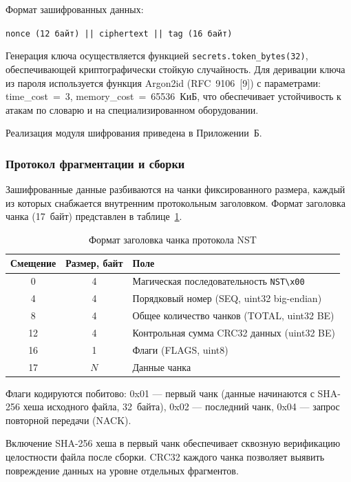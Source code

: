 Формат зашифрованных данных:
\begin{center}
\texttt{nonce (12 байт) || ciphertext || tag (16 байт)}
\end{center}

Генерация ключа осуществляется функцией \texttt{secrets.token\_bytes(32)}, обеспечивающей криптографически стойкую случайность. Для деривации ключа из пароля используется функция Argon2id (RFC~9106~[9]) с параметрами: time\_cost~=~3, memory\_cost~=~65536~КиБ, что обеспечивает устойчивость к атакам по словарю и на специализированном оборудовании.

Реализация модуля шифрования приведена в Приложении~Б.

\subsubsection{Протокол фрагментации и сборки}

Зашифрованные данные разбиваются на чанки фиксированного размера, каждый из которых снабжается внутренним протокольным заголовком. Формат заголовка чанка (17~байт) представлен в таблице~\ref{tab:chunk_header}.

\begin{table}[htb]
\centering
\caption{Формат заголовка чанка протокола NST}
\label{tab:chunk_header}
\begin{tabular}{|c|c|l|}
\hline
Смещение & Размер, байт & Поле \\
\hline
0  & 4 & Магическая последовательность \texttt{NST\textbackslash x00} \\
4  & 4 & Порядковый номер (SEQ, uint32 big-endian) \\
8  & 4 & Общее количество чанков (TOTAL, uint32 BE) \\
12 & 4 & Контрольная сумма CRC32 данных (uint32 BE) \\
16 & 1 & Флаги (FLAGS, uint8) \\
17 & $N$ & Данные чанка \\
\hline
\end{tabular}
\end{table}

Флаги кодируются побитово: 0x01 --- первый чанк (данные начинаются с SHA-256 хеша исходного файла, 32~байта), 0x02 --- последний чанк, 0x04 --- запрос повторной передачи (NACK).

Включение SHA-256 хеша в первый чанк обеспечивает сквозную верификацию целостности файла после сборки. CRC32 каждого чанка позволяет выявить повреждение данных на уровне отдельных фрагментов.

